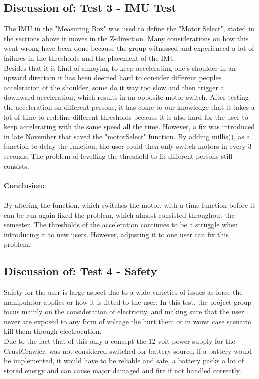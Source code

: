 \subsection*{Discussion of: Test 3 - IMU Test}
The IMU in the "Measuring Box" was used to define the "Motor Select", stated in the sections above it moves in the Z-direction. Many considerations on how this went wrong have been done because the group witnessed and experienced a lot of failures in the thresholds and the placement of the IMU.\\
Besides that it is kind of annoying to keep accelerating one's shoulder in an upward direction it has been deemed hard to consider different peoples acceleration of the shoulder, some do it way too slow and then trigger a downward acceleration, which results in an opposite motor switch. After testing the acceleration on different persons, it has come to our knowledge that it takes a lot of time to redefine different thresholds because it is also hard for the user to keep accelerating with the same speed all the time. However, a fix was introduced in late November that saved the "motorSelect" function. By adding millis(), as a function to delay the function, the user could then only switch motors in every 3 seconds. The problem of levelling the threshold to fit different persons still consists.
\paragraph{Conclusion:} By altering the function, which switches the motor, with a time function before it can be run again fixed the problem, which almost consisted throughout the semester. The thresholds of the acceleration continues to be a struggle when introducing it to new users. However, adjusting it to one user can fix this problem.

\subsection*{Discussion of: Test 4 - Safety}
Safety for the user is large aspect due to a wide varieties of issues as force the manipulator applies or how it is fitted to the user. In this test, the project group focus mainly on the consideration of electricity, and making sure that the user never are exposed to any form of voltage the hurt them or in worst case scenario kill them through electrocution.\\
Due to the fact that of this only a concept the 12 volt power supply for the CrustCrawler, was not considered switched for battery source, if a battery would be implemented, it would have to be reliable and safe, a battery packs a lot of stored energy and can cause major damaged and fire if not handled correctly.
